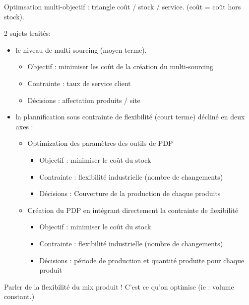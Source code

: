Optimsation multi-objectif : triangle coût / stock / service. (coût = coût hors stock).


2 sujets traités:
\begin{itemize}
  \item le niveau de multi-sourcing (moyen terme).
  \begin{itemize}
    \item Objectif : minimiser les coût de la création du multi-sourcing
    \item Contrainte : taux de service client
    \item Décisions : affectation produits / site
  \end{itemize}
  \item la plannification sous contrainte de flexibilité (court terme) décliné en deux axes :
  \begin{itemize}
    \item Optimization des paramètres des outils de PDP
    \begin{itemize}
      \item Objectif : minimiser le coût du stock
      \item Contrainte : flexibilité industrielle (nombre de changements)
      \item Décisions : Couverture de la production de chaque produits
    \end{itemize}
    \item Création du PDP en intégrant directement la contrainte de flexibilité
    \begin{itemize}
      \item Objectif : minimiser le coût du stock
      \item Contrainte : flexibilité industrielle (nombre de changements)
      \item Décisions : période de production et quantité produite pour chaque produit
    \end{itemize}
  \end{itemize}
\end{itemize}


Parler de la flexibilité du mix produit ! C'est ce qu'on optimise (ie : volume constant.)